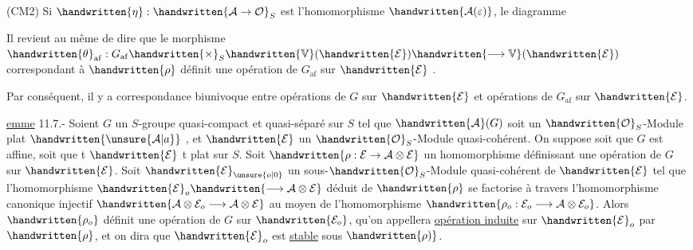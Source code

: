 (CM2) Si $\handwritten{\eta}:\handwritten{\mathcal{A}\to\mathcal{O}}_S$ est l'homomorphisme $\handwritten{\mathcal{A}(\varepsilon)}$, le diagramme

Il revient au même de dire que le morphisme $\handwritten{\theta}_{\mathrm{af}}:G_{\mathrm{af}}\handwritten{\times}_S\handwritten{\mathbb{V}}(\handwritten{\mathcal{E}})\handwritten{\longrightarrow\mathbb{V}}(\handwritten{\mathcal{E}})$ correspondant à $\handwritten{\rho}$ définit une opération de $G_{\mathrm{af}}$ sur $\handwritten{\mathcal{E}}$  .

Par conséquent, il y a correspondance biunivoque entre opérations de $G$ sur $\handwritten{\mathcal{E}}$ et opérations de $G_{\mathrm{af}}$ sur $\handwritten{\mathcal{E}}$.

\uline{emme} 11.7.- Soient $G$ un $S$-groupe quasi-compact et quasi-séparé sur $S$\handwritten{,} tel que $\handwritten{\mathcal{A}}(G)$ soit
un $\handwritten{\mathcal{O}}_S$-Module plat $\handwritten{\unsure{\mathcal{A}|a}}$ , et $\handwritten{\mathcal{E}}$ un $\handwritten{\mathcal{O}}_S$-Module quasi-cohérent. On suppose soit que $G$ est affine, soit que t $\handwritten{\mathcal{E}}$ t plat sur $S$. Soit $\handwritten{\rho:\mathcal{E}\to\mathcal{A}\otimes\mathcal{E}}$ un homomorphisme définissant une opération de $G$ sur $\handwritten{\mathcal{E}}$. Soit $\handwritten{\mathcal{E}}_{\unsure{o|0}}$ un sous-$\handwritten{\mathcal{O}}_S$-Module quasi-cohérent de $\handwritten{\mathcal{E}}$ tel que l'homomorphisme $\handwritten{\mathcal{E}}_o\handwritten{\longrightarrow\mathcal{A}\otimes\mathcal{E}}$ déduit de $\handwritten{\rho}$ se factorise à travers l'homomorphisme canonique \handwritten{(}injectif $\handwritten{\mathcal{A}\otimes\mathcal{E}_o\longrightarrow\mathcal{A}\otimes\mathcal{E}}$ au moyen de l'homomorphisme $\handwritten{\rho_o:\mathcal{E}_o\longrightarrow\mathcal{A}\otimes\mathcal{E}_o}$. Alors $\handwritten{\rho_o}$ définit une opération de $G$ sur $\handwritten{\mathcal{E}_o}$\handwritten{(},\handwritten{\unsure{(}} qu'on appellera \uline{opération induite} sur $\handwritten{\mathcal{E}}_o$ par $\handwritten{\rho}$, et on dira que $\handwritten{\mathcal{E}}_o$ est \uline{stable} sous $\handwritten{\rho)}$.

